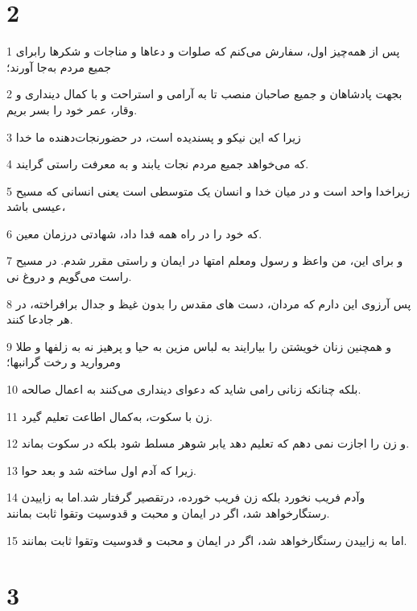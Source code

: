 \chapter{2}

\par 1 پس از همه‌چیز اول، سفارش می‌کنم که صلوات و دعاها و مناجات و شکرها رابرای جمیع مردم به‌جا آورند؛
\par 2 بجهت پادشاهان و جمیع صاحبان منصب تا به آرامی و استراحت و با کمال دینداری و وقار، عمر خود را بسر بریم.
\par 3 زیرا که این نیکو و پسندیده است، در حضورنجات‌دهنده ما خدا
\par 4 که می‌خواهد جمیع مردم نجات یابند و به معرفت راستی گرایند.
\par 5 زیراخدا واحد است و در میان خدا و انسان یک متوسطی است یعنی انسانی که مسیح عیسی باشد،
\par 6 که خود را در راه همه فدا داد، شهادتی درزمان معین.
\par 7 و برای این، من واعظ و رسول ومعلم امتها در ایمان و راستی مقرر شدم. در مسیح راست می‌گویم و دروغ نی.
\par 8 پس آرزوی این دارم که مردان، دست های مقدس را بدون غیظ و جدال برافراخته، در هر جادعا کنند.
\par 9 و همچنین زنان خویشتن را بیارایند به لباس مزین به حیا و پرهیز نه به زلفها و طلا ومروارید و رخت گرانبها؛
\par 10 بلکه چنانکه زنانی رامی شاید که دعوای دینداری می‌کنند به اعمال صالحه.
\par 11 زن با سکوت، به‌کمال اطاعت تعلیم گیرد.
\par 12 و زن را اجازت نمی دهم که تعلیم دهد یابر شوهر مسلط شود بلکه در سکوت بماند.
\par 13 زیرا که آدم اول ساخته شد و بعد حوا.
\par 14 وآدم فریب نخورد بلکه زن فریب خورده، درتقصیر گرفتار شد.اما به زاییدن رستگارخواهد شد، اگر در ایمان و محبت و قدوسیت وتقوا ثابت بمانند.
\par 15 اما به زاییدن رستگارخواهد شد، اگر در ایمان و محبت و قدوسیت وتقوا ثابت بمانند.

\chapter{3}

